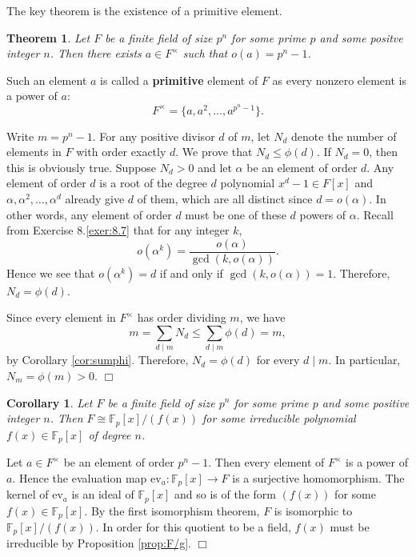 \documentclass{article}
\def\F{{\mathbb F}}
\def\F{{\mathbb F}}
\newtheorem{theorem}[subsection]{Theorem}
\newtheorem{cor}[subsection]{Corollary}
\newenvironment{proof}{\noindent {\bf Proof:}}{$\Box$ \vspace{2 ex}}
\begin{document}
The key theorem is the existence of a primitive element.

\begin{theorem}
    Let $F$ be a finite field of size $p^n$ for some prime $p$ and some positve integer $n$. Then there exists $a\in F^\times$ such that $o(a) = p^n - 1$.
\end{theorem}
Such an element $a$ is called a \textbf{primitive} element of $F$ as every nonzero element is a power of $a$:
$$F^\times = \{a,a^2,\ldots,a^{p^n - 1}\}.$$

\begin{proof}
    Write $m = p^n - 1$. For any positive divisor $d$ of $m$, let $N_d$ denote the number of elements in $F$ with order exactly $d$. We prove that $N_d\leq\phi(d)$. If $N_d = 0$, then this is obviously true. Suppose $N_d > 0$ and let $\alpha$ be an element of order $d$. Any element of order $d$ is a root of the degree $d$ polynomial $x^d - 1\in F[x]$ and $\alpha,\alpha^2,\ldots,\alpha^{d}$ already give $d$ of them, which are all distinct since $d = o(\alpha)$. In other words, any element of order $d$ must be one of these $d$ powers of $\alpha$. Recall from Exercise 8.\ref{exer:8.7} that for any integer $k$, $$o(\alpha^k) = \frac{o(\alpha)}{\gcd(k, o(\alpha))}.$$ Hence we see that $o(\alpha^k) = d$ if and only if $\gcd(k, o(\alpha)) = 1$. Therefore, $N_d = \phi(d)$. 

    Since every element in $F^\times$ has order dividing $m$, we have
    $$m = \sum_{d\mid m}N_d \leq \sum_{d\mid m}\phi(d) = m,$$
    by Corollary \ref{cor:sumphi}. Therefore, $N_d = \phi(d)$ for every $d\mid m$. In particular, $N_m = \phi(m) > 0$.
\end{proof}


\begin{cor}
    Let $F$ be a finite field of size $p^n$ for some prime $p$ and some positive integer $n$. Then $F\cong \F_p[x]/(f(x))$ for some irreducible polynomial $f(x)\in\F_p[x]$ of degree $n$.
\end{cor}

\begin{proof}
    Let $a\in F^\times$ be an element of order $p^n - 1$. Then every element of $F^\times$ is a power of $a$. Hence the evaluation map $\text{ev}_a:\F_p[x] \rightarrow F$ is a surjective homomorphism. The kernel of $\text{ev}_a$ is an ideal of $\F_p[x]$ and so is of the form $(f(x))$ for some $f(x)\in\F_p[x]$. By the first isomorphism theorem, $F$ is isomorphic to $\F_p[x]/(f(x))$. In order for this quotient to be a field, $f(x)$ must be irreducible by Proposition \ref{prop:F/g}.
\end{proof}
\end{document}
